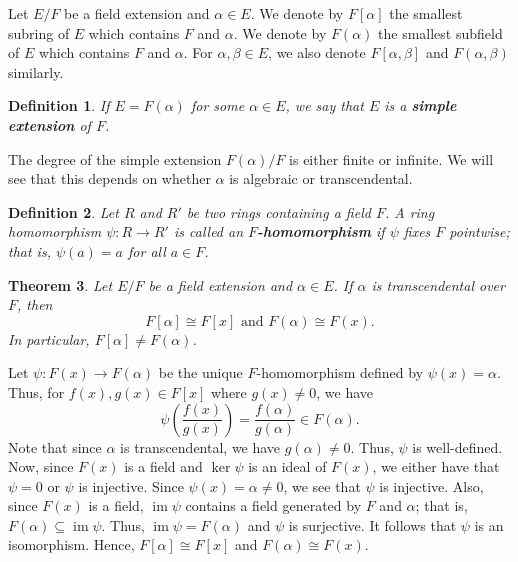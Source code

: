 \documentclass[10pt]{article}
\makeatletter
\DeclareMathOperator{\im}{im}
\theoremstyle{newstyle}
\newtheorem{thm}{Theorem}[section]
\newtheorem{defn}[thm]{Definition}
\newenvironment{pf}[1][\proofname]{\par
  \pushQED{\qed}%
  \normalfont \topsep0\p@\relax
  \trivlist
  \item[\hskip\labelsep\scshape
  #1\@addpunct{.}]\ignorespaces
}{%
  \popQED\endtrivlist\@endpefalse
}
\makeatother
\begin{document}
Let $E/F$ be a field extension and $\alpha \in E$. We denote by $F[\alpha]$ the smallest 
subring of $E$ which contains $F$ and $\alpha$. We denote by $F(\alpha)$ the smallest 
subfield of $E$ which contains $F$ and $\alpha$. For $\alpha, \beta \in E$, we also denote 
$F[\alpha, \beta]$ and $F(\alpha, \beta)$ similarly.

\begin{defn}
If $E = F(\alpha)$ for some $\alpha \in E$, we say that $E$ is a {\bf simple extension} of $F$.
\end{defn}

The degree of the simple extension $F(\alpha)/F$ is either finite or infinite. We will see that 
this depends on whether $\alpha$ is algebraic or transcendental.

\begin{defn}
Let $R$ and $R'$ be two rings containing a field $F$. A ring homomorphism $\psi : R \to R'$ 
is called an {\bf $F$-homomorphism} if $\psi$ fixes $F$ pointwise; that is, 
$\psi(a) = a$ for all $a \in F$.
\end{defn}

\begin{thm}
Let $E/F$ be a field extension and $\alpha \in E$. If $\alpha$ is transcendental over $F$, 
then 
\[ F[\alpha] \cong F[x] \text{ and } F(\alpha) \cong F(x). \]
In particular, $F[\alpha] \neq F(\alpha)$.
\end{thm}
\begin{pf}
Let $\psi : F(x) \to F(\alpha)$ be the unique $F$-homomorphism defined by $\psi(x) = \alpha$. 
Thus, for $f(x), g(x) \in F[x]$ where $g(x) \neq 0$, we have 
\[ \psi \left( \frac{f(x)}{g(x)} \right) = \frac{f(\alpha)}{g(\alpha)} \in F(\alpha). \]
Note that since $\alpha$ is transcendental, we have $g(\alpha) \neq 0$. 
Thus, $\psi$ is well-defined. Now, since $F(x)$ is a field and $\ker\psi$ is an ideal of $F(x)$, 
we either have that $\psi = 0$ or $\psi$ is injective. Since $\psi(x) = \alpha \neq 0$, 
we see that $\psi$ is injective. Also, since $F(x)$ is a field, $\im\psi$ contains a 
field generated by $F$ and $\alpha$; that is, $F(\alpha) \subseteq \im\psi$. 
Thus, $\im\psi = F(\alpha)$ and $\psi$ is surjective. It follows that $\psi$ is an isomorphism. 
Hence, $F[\alpha] \cong F[x]$ and $F(\alpha) \cong F(x)$.
\end{pf}
\end{document}
